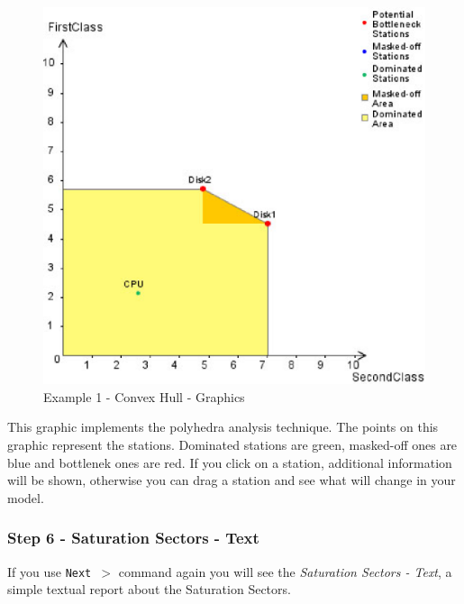 \begin{figure}[htbp]
    \begin{center}
        \includegraphics[scale=.6]{img/jaba/example1ConvexHull}
    \end{center}
    \caption{Example 1 - Convex Hull - Graphics}
    \label{fig:jaba:example1ConvexHull}
\end{figure}

This graphic implements the polyhedra analysis technique. The points on this graphic represent the stations. Dominated stations are green, masked-off ones are blue and bottlenek ones are red. If you click on a station, additional information will be shown, otherwise you can drag a station and see what will change in your model.

\subsubsection{Step 6 - Saturation Sectors - Text}

If you use \texttt{Next $>$} command again you will see the \textit{Saturation Sectors - Text}, a simple textual report about the Saturation Sectors.


